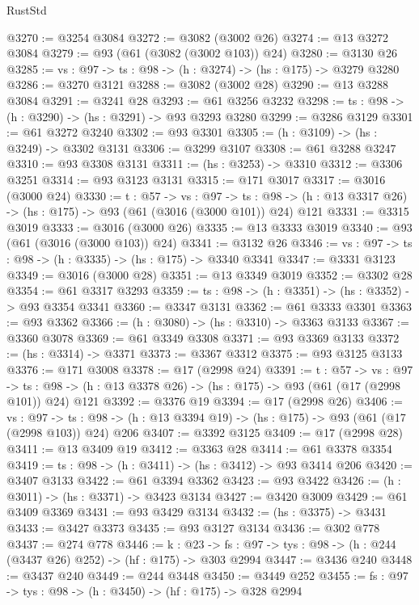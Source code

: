 \begin{lexlean}{RustStd}
\begin{coremodule}
@3270 := @3254 @3084
@3272 := @3082 (@3002 @26)
@3274 := @13 @3272 @3084
@3279 := @93 (@61 (@3082 (@3002 @103)) @24)
@3280 := @3130 @26
@3285 := {vs : @97} -> {ts : @98} -> (h : @3274) -> (hs : @175) -> @3279 @3280
@3286 := @3270 @3121
@3288 := @3082 (@3002 @28)
@3290 := @13 @3288 @3084
@3291 := @3241 @28
@3293 := @61 @3256 @3232
@3298 := {ts : @98} -> (h : @3290) -> (hs : @3291) -> @93 @3293 @3280
@3299 := @3286 @3129
@3301 := @61 @3272 @3240
@3302 := @93 @3301
@3305 := (h : @3109) -> (hs : @3249) -> @3302 @3131
@3306 := @3299 @3107
@3308 := @61 @3288 @3247
@3310 := @93 @3308 @3131
@3311 := (hs : @3253) -> @3310
@3312 := @3306 @3251
@3314 := @93 @3123 @3131
@3315 := @171 @3017
@3317 := @3016 (@3000 @24)
@3330 := {t : @57} ->
  {vs : @97} ->
  {ts : @98} -> (h : @13 @3317 @26) -> (hs : @175) -> @93 (@61 (@3016 (@3000 @101)) @24) @121
@3331 := @3315 @3019
@3333 := @3016 (@3000 @26)
@3335 := @13 @3333 @3019
@3340 := @93 (@61 (@3016 (@3000 @103)) @24)
@3341 := @3132 @26
@3346 := {vs : @97} -> {ts : @98} -> (h : @3335) -> (hs : @175) -> @3340 @3341
@3347 := @3331 @3123
@3349 := @3016 (@3000 @28)
@3351 := @13 @3349 @3019
@3352 := @3302 @28
@3354 := @61 @3317 @3293
@3359 := {ts : @98} -> (h : @3351) -> (hs : @3352) -> @93 @3354 @3341
@3360 := @3347 @3131
@3362 := @61 @3333 @3301
@3363 := @93 @3362
@3366 := (h : @3080) -> (hs : @3310) -> @3363 @3133
@3367 := @3360 @3078
@3369 := @61 @3349 @3308
@3371 := @93 @3369 @3133
@3372 := (hs : @3314) -> @3371
@3373 := @3367 @3312
@3375 := @93 @3125 @3133
@3376 := @171 @3008
@3378 := @17 (@2998 @24)
@3391 := {t : @57} ->
  {vs : @97} ->
  {ts : @98} -> (h : @13 @3378 @26) -> (hs : @175) -> @93 (@61 (@17 (@2998 @101)) @24) @121
@3392 := @3376 @19
@3394 := @17 (@2998 @26)
@3406 := {vs : @97} ->
  {ts : @98} -> (h : @13 @3394 @19) -> (hs : @175) -> @93 (@61 (@17 (@2998 @103)) @24) @206
@3407 := @3392 @3125
@3409 := @17 (@2998 @28)
@3411 := @13 @3409 @19
@3412 := @3363 @28
@3414 := @61 @3378 @3354
@3419 := {ts : @98} -> (h : @3411) -> (hs : @3412) -> @93 @3414 @206
@3420 := @3407 @3133
@3422 := @61 @3394 @3362
@3423 := @93 @3422
@3426 := (h : @3011) -> (hs : @3371) -> @3423 @3134
@3427 := @3420 @3009
@3429 := @61 @3409 @3369
@3431 := @93 @3429 @3134
@3432 := (hs : @3375) -> @3431
@3433 := @3427 @3373
@3435 := @93 @3127 @3134
@3436 := @302 @778
@3437 := @274 @778
@3446 := {k : @23} ->
  {fs : @97} -> {tys : @98} -> (h : @244 (@3437 @26) @252) -> (hf : @175) -> @303 @2994
@3447 := @3436 @240
@3448 := @3437 @240
@3449 := @244 @3448
@3450 := @3449 @252
@3455 := {fs : @97} -> {tys : @98} -> (h : @3450) -> (hf : @175) -> @328 @2994

\end{coremodule}
\end{lexlean}
